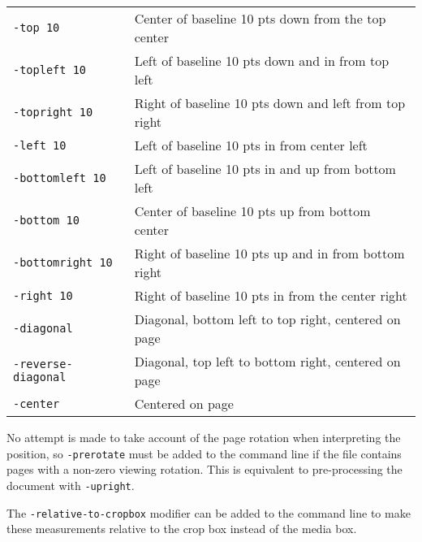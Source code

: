 \documentclass{book}
\begin{document}
  \begin{framed}
    \noindent\begin{tabular}{ll}
      \small\verb!-top 10! & Center of baseline 10 pts down from the top center \\
      \small\verb!-topleft 10! & Left of baseline 10 pts down and in from top left \\
      \small\verb!-topright 10! & Right of baseline 10 pts down and left from top right\\
      \small\verb!-left 10! & Left of baseline 10 pts in from center left \\
      \small\verb!-bottomleft 10! & Left of baseline 10 pts in and up from bottom left \\
      \small\verb!-bottom 10! & Center of baseline 10 pts up from bottom center\\
      \small\verb!-bottomright 10! & Right of baseline 10 pts up and in from bottom right \\
      \small\verb!-right 10! & Right of baseline 10 pts in from the center right \\
      \small\verb!-diagonal! & Diagonal, bottom left to top right, centered on page\\
      \small\verb!-reverse-diagonal! & Diagonal, top left to bottom right, centered on page\\    
      \small\verb!-center! & Centered on page\\
    \end{tabular}
  \end{framed}

\noindent No attempt is made to take account of the page rotation when interpreting the
position, so \texttt{-prerotate} must be added to the command line if the file
contains pages with a non-zero viewing rotation. This is equivalent to
pre-processing the document with \texttt{-upright}.
   

The \texttt{-relative-to-cropbox} modifier can be added to the command line to
make these measurements relative to the crop box instead of the media box.
\end{document}
